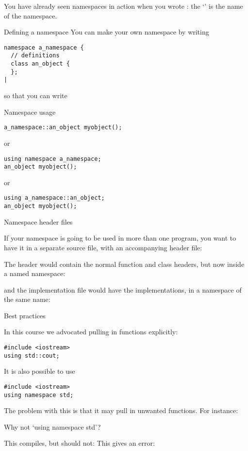 You have already seen namespaces in action when you wrote
: the `' is the name of the namespace.

\begin{block}{Defining a namespace}
  \label{sl:namespace-def}
  You can make your own namespace by writing
\begin{lstlisting}
namespace a_namespace {
  // definitions
  class an_object { 
  };
|
\end{lstlisting}
\end{block}

so that you can write
\begin{block}{Namespace usage}
  \label{sl:namespace-use}
\begin{lstlisting}
a_namespace::an_object myobject();
\end{lstlisting}
or
\begin{lstlisting}
using namespace a_namespace;
an_object myobject();
\end{lstlisting}
or
\begin{lstlisting}
using a_namespace::an_object;
an_object myobject();
\end{lstlisting}
\end{block}

 {Namespace header files}

If your namespace is going to be used in more than one program, you
want to have it in a separate source file, with an accompanying header
file:
%

The header would contain the normal function and class headers, but
now inside a named namespace:
%

and the implementation file would have the implementations, in a
namespace of the same name:
%

 {Best practices}

In this course we advocated
pulling in functions explicitly:
\begin{lstlisting}
#include <iostream>
using std::cout;
\end{lstlisting}

It is also possible to use
\begin{lstlisting}
#include <iostream>
using namespace std;
\end{lstlisting}

The problem with this
is that it may pull in unwanted functions. For instance:

\begin{block}{Why not `using namespace std'?}
  \label{sl:namespace-std-harm}
  \begin{multicols}{2}
    This compiles, but should not:
    \vfill\columnbreak
    This gives an error:
  \end{multicols}
\end{block}


